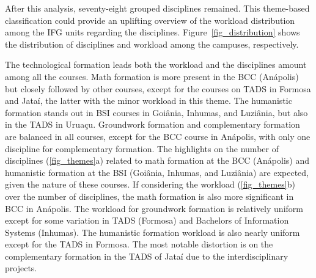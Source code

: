 \documentclass[sigconf, review]{educomp}
\begin{document}
After this analysis, seventy-eight grouped disciplines remained.
This theme-based classification could provide an uplifting overview of the workload distribution among the IFG units regarding the disciplines.
Figure~\ref{fig_distribution} shows the distribution of disciplines and workload among the campuses, respectively.

The technological formation leads both the workload and the disciplines amount among all the courses.
Math formation is more present in the BCC (Anápolis) but closely followed by other courses, except for the courses on TADS in Formosa and Jataí, the latter with the minor workload in this theme.
The humanistic formation stands out in BSI courses in Goiânia, Inhumas, and Luziânia, but also in the TADS in Uruaçu.
Groundwork formation and complementary formation are balanced in all courses, except for the BCC course in Anápolis, with only one discipline for complementary formation.
The highlights on the number of disciplines (\ref{fig_themes}a) related to math formation at the BCC (Anápolis) and humanistic formation at the BSI (Goiânia, Inhumas, and Luziânia) are expected, given the nature of these courses.
If considering the workload (\ref{fig_themes}b) over the number of disciplines, the math formation is also more significant in BCC in Anápolis.
The workload for groundwork formation is relatively uniform except for some variation in TADS (Formosa) and Bachelors of Information Systems (Inhumas).
The humanistic formation workload is also nearly uniform except for the TADS in Formosa.
The most notable distortion is on the complementary formation in the TADS of Jataí due to the interdisciplinary projects.
\end{document}
